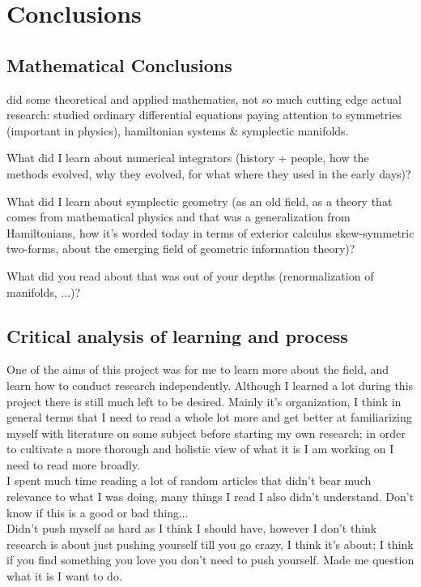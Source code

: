 \documentclass[12pt]{article}
\begin{document}
\section{Conclusions}
\subsection{Mathematical Conclusions}
did some theoretical and applied mathematics, not so much cutting edge actual research: studied ordinary differential equations paying attention to symmetries (important in physics), hamiltonian systems \& symplectic manifolds. 

What did I learn about numerical integrators (history + people, how the methods evolved, why they evolved, for what where they used in the early days)?

What did I learn about symplectic geometry (as an old field, as a theory that comes from mathematical physics and that was a generalization from Hamiltonians, how it's worded today in terms of exterior calculus skew-symmetric two-forms, about the emerging field of geometric information theory)?

What did you read about that was out of your depths (renormalization of manifolds, ...)?

\subsection{Critical analysis of learning and process}
One of the aims of this project was for me to learn more about the field, and learn how to conduct research independently. Although I learned a lot during this project there is still much left to be desired. Mainly it's organization, I think in general terms that I need to read a whole lot more and get better at familiarizing myself with literature on some subject before starting my own research; in order to cultivate a more thorough and holistic view of what it is I am working on I need to read more broadly. \\

I spent much time reading a lot of random articles that didn't bear much relevance to what I was doing, many things I read I also didn't understand. Don't know if this is a good or bad thing... \\

Didn't push myself as hard as I think I should have, however I don't think research is about just pushing yourself till you go crazy, I think it's about; I think if you find something you love you don't need to push yourself. Made me question what it is I want to do. \\
\end{document}
